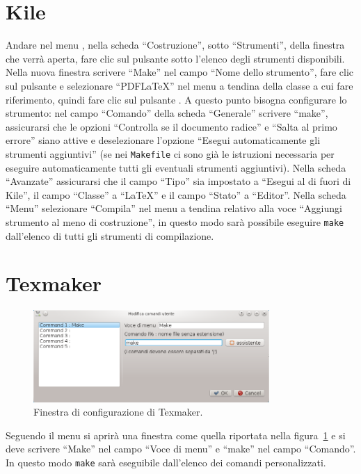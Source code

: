\section{Kile}
\label{sec:kile}

Andare nel menu , nella scheda
``Costruzione'', sotto ``Strumenti'', della finestra che verrà aperta, fare clic
sul pulsante  sotto l'elenco degli strumenti disponibili.
Nella nuova finestra scrivere ``Make'' nel campo ``Nome dello strumento'', fare
clic sul pulsante  e selezionare ``PDFLaTeX'' nel menu a
tendina della classe a cui fare riferimento, quindi fare clic sul pulsante
.  A questo punto bisogna configurare lo strumento: nel campo
``Comando'' della scheda ``Generale'' scrivere ``make'', assicurarsi che le
opzioni ``Controlla se il documento radice'' e ``Salta al primo errore'' siano
attive e deselezionare l'opzione ``Esegui automaticamente gli strumenti
aggiuntivi'' (se nei \texttt{Makefile} ci sono già le istruzioni necessaria per
eseguire automaticamente tutti gli eventuali strumenti aggiuntivi).  Nella
scheda ``Avanzate'' assicurarsi che il campo ``Tipo'' sia impostato a ``Esegui
al di fuori di Kile'', il campo ``Classe'' a ``LaTeX'' e il campo ``Stato'' a
``Editor''.  Nella scheda ``Menu'' selezionare ``Compila'' nel menu a tendina
relativo alla voce ``Aggiungi strumento al meno di costruzione'', in questo modo
sarà possibile eseguire \texttt{make} dall'elenco di tutti gli strumenti di
compilazione.

\section{Texmaker}
\label{sec:texmaker}

\begin{figure}
  \centering
  \includegraphics[width=0.8\textwidth]{figure/texmaker}
  \caption{Finestra di configurazione di Texmaker.}
  \label{fig:texmaker}
\end{figure}
Seguendo il menu
 si aprirà una
finestra come quella riportata nella figura~\ref{fig:texmaker} e si deve
scrivere ``Make'' nel campo ``Voce di menu'' e ``make'' nel campo ``Comando''.
In questo modo \texttt{make} sarà eseguibile dall'elenco dei comandi
personalizzati.

